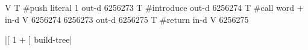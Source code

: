 \centering

  \begin{factorcode}
    V{
        T{ #push { literal 1 } { out-d { 6256273 } } }
        T{ #introduce { out-d { 6256274 } } }
        T{ #call
            { word + }
            { in-d V{ 6256274 6256273 } }
            { out-d { 6256275 } }
        }
        T{ #return { in-d V{ 6256275 } } }
    }
  \end{factorcode}

\caption{\factor|[ 1 + ] build-tree|}
